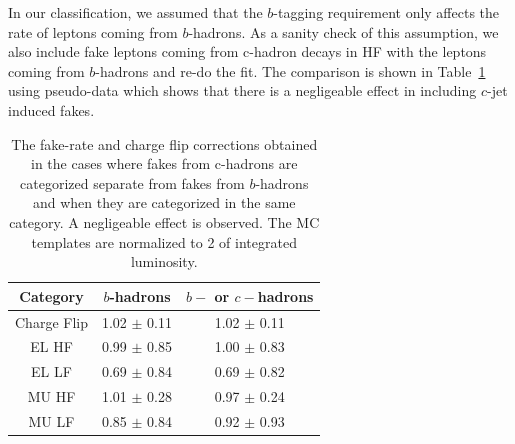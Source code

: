In our classification, we assumed that the $b$-tagging requirement only affects the rate of leptons coming from $b$-hadrons. 
As a sanity check of this assumption, we also include fake leptons coming from c-hadron decays in HF 
with the leptons coming from $b$-hadrons and re-do the fit. 
The comparison is shown in Table~\ref{t:compare_b_bc} using pseudo-data which shows that there is a negligeable effect in including $c$-jet induced fakes. 

 \begin{table}[!htb]
  \caption{The fake-rate and charge flip corrections obtained in the cases where fakes from c-hadrons are categorized separate from fakes from $b$-hadrons and  when they are categorized in the same category. A negligeable effect is observed. The MC templates are normalized to 2 \ifb of integrated luminosity.
  \label{t:compare_b_bc}}
\centering
    \begin{tabular}{|c|c|c|}
      \hline
      Category & $b$-hadrons & $b-$ or $c-$hadrons \\
      \hline
      Charge Flip   &   1.02 $\pm$ 0.11  & 1.02  $\pm$  0.11 \\
      EL HF     &   0.99 $\pm$ 0.85  & 1.00  $\pm$  0.83 \\
      EL LF     &   0.69 $\pm$ 0.84  & 0.69  $\pm$  0.82 \\
      MU HF     &   1.01 $\pm$ 0.28  & 0.97  $\pm$  0.24 \\
      MU LF     &   0.85 $\pm$ 0.84  & 0.92  $\pm$  0.93 \\
      \hline
    \end{tabular}
 \end{table}



